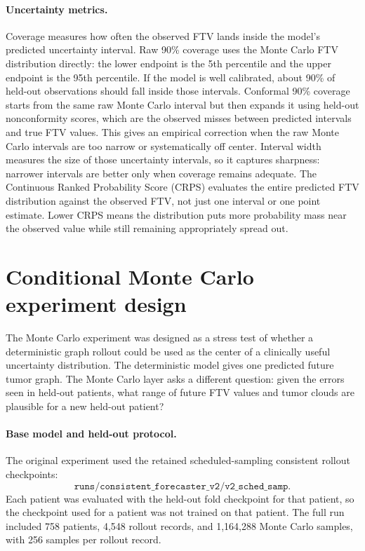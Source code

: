 \documentclass[11pt]{article}
\begin{document}
\paragraph{Uncertainty metrics.}
Coverage measures how often the observed FTV lands inside the model's predicted
uncertainty interval. Raw 90\% coverage uses the Monte Carlo FTV distribution
directly: the lower endpoint is the 5th percentile and the upper endpoint is the
95th percentile. If the model is well calibrated, about 90\% of held-out
observations should fall inside those intervals. Conformal 90\% coverage starts
from the same raw Monte Carlo interval but then expands it using held-out
nonconformity scores, which are the observed misses between predicted intervals
and true FTV values. This gives an empirical correction when the raw Monte Carlo
intervals are too narrow or systematically off center. Interval width measures
the size of those uncertainty intervals, so it captures sharpness: narrower
intervals are better only when coverage remains adequate. The Continuous Ranked
Probability Score (CRPS) evaluates the entire predicted FTV distribution against
the observed FTV, not just one interval or one point estimate. Lower CRPS means
the distribution puts more probability mass near the observed value while still
remaining appropriately spread out.

\section{Conditional Monte Carlo experiment design}

The Monte Carlo experiment was designed as a stress test of whether a
deterministic graph rollout could be used as the center of a clinically useful
uncertainty distribution. The deterministic model gives one predicted future
tumor graph. The Monte Carlo layer asks a different question: given the errors
seen in held-out patients, what range of future FTV values and tumor clouds are
plausible for a new held-out patient?

\paragraph{Base model and held-out protocol.}
The original experiment used the retained scheduled-sampling consistent rollout
checkpoints:
\[
\texttt{runs/consistent\_forecaster\_v2/v2\_sched\_samp}.
\]
Each patient was evaluated with the held-out fold checkpoint for that patient,
so the checkpoint used for a patient was not trained on that patient. The full
run included 758 patients, 4,548 rollout records, and 1,164,288 Monte Carlo
samples, with 256 samples per rollout record.
\end{document}
